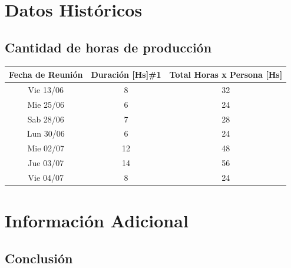 \documentclass[10pt]{article} %
\begin{document}
\section{Datos Históricos}
\subsection{Cantidad de horas de producción}
\begin{center}
\begin{tabular}{c c c}
\hline\hline %
Fecha de Reunión & Duración [Hs]\#1 & Total Horas x Persona [Hs] \\ [0.5ex] %
\hline %
Vie 13/06 & 8 & 32 \\ %
Mie 25/06 & 6 & 24 \\ 
Sab 28/06 & 7 & 28 \\ 
Lun 30/06 & 6 & 24 \\ 
Mie 02/07 & 12 & 48 \\ 
Jue 03/07 & 14 & 56 \\
Vie 04/07 & 8 & 24 \\ [1ex] %
\hline %
\end{tabular}
\end{center}

\section{Información Adicional}


\subsection{Conclusión} %
\end{document}
